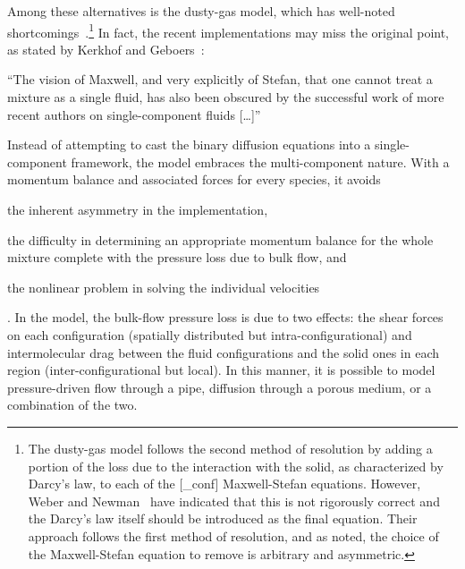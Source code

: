 Among these alternatives is the dusty-gas model\label{mark:Dusty}, which has well-noted shortcomings~\cite{Kulikovsky1999, Weber2004ChemRev, Weber2005, Kerkhof2005ChemEngSci}.\footnote{\label{note:DustyGas}The dusty-gas model follows the second method of resolution by adding a portion of the loss due to the interaction with the solid, as characterized by Darcy's law, to each of the [_conf] Maxwell-Stefan equations.  However, Weber and Newman~\cite{Weber2004ChemRev} have indicated that this is not rigorously correct and the Darcy's law itself should be introduced as the final equation.  Their approach follows the first method of resolution, and as noted, the choice of the Maxwell-Stefan equation to remove is arbitrary and asymmetric.}  In fact, the recent implementations may miss the original point, as stated by Kerkhof and Geboers~\cite{Kerkhof2005ChemEngSci}:
\begin{longquote}
  ``The vision of Maxwell, and very explicitly of Stefan, that one cannot treat a mixture as a single fluid, has also been obscured by the successful work of more recent authors on single-component fluids [\dots]''
\end{longquote}
Instead of attempting to cast the binary diffusion equations into a single-component framework, the model embraces the multi-component nature.  With a momentum balance and associated forces for every species, it avoids \begin{inparaenum}[(1)] \item the inherent asymmetry in the implementation, \item the difficulty in determining an appropriate momentum balance for the whole mixture complete with the pressure loss due to bulk flow, and \item the nonlinear problem in solving the individual velocities\end{inparaenum}.  In the model, the bulk-flow pressure loss is due to two effects: the shear forces on each configuration (spatially distributed but intra-configurational) and intermolecular drag between the fluid configurations and the solid ones in each region (inter-configurational but local).  In this manner, it is possible to model pressure-driven flow through a pipe, diffusion through a porous medium, or a combination of the two.



